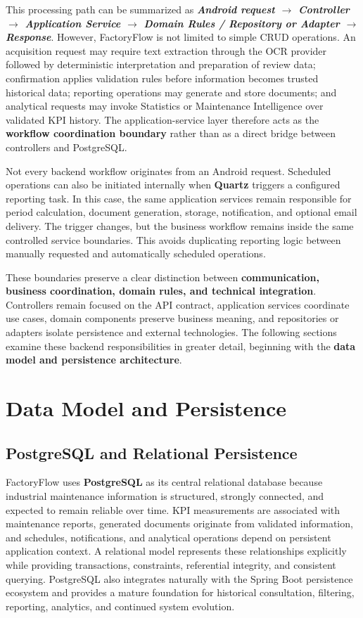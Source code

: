 This processing path can be summarized as \textbf{\textit{Android request $\rightarrow$ Controller $\rightarrow$ Application Service $\rightarrow$ Domain Rules / Repository or Adapter $\rightarrow$ Response}}. However, FactoryFlow is not limited to simple CRUD operations. An acquisition request may require text extraction through the OCR provider followed by deterministic interpretation and preparation of review data; confirmation applies validation rules before information becomes trusted historical data; reporting operations may generate and store documents; and analytical requests may invoke Statistics or Maintenance Intelligence over validated KPI history. The application-service layer therefore acts as the \textbf{workflow coordination boundary} rather than as a direct bridge between controllers and PostgreSQL.

Not every backend workflow originates from an Android request. Scheduled operations can also be initiated internally when \textbf{Quartz} triggers a configured reporting task. In this case, the same application services remain responsible for period calculation, document generation, storage, notification, and optional email delivery. The trigger changes, but the business workflow remains inside the same controlled service boundaries. This avoids duplicating reporting logic between manually requested and automatically scheduled operations.

These boundaries preserve a clear distinction between \textbf{communication, business coordination, domain rules, and technical integration}. Controllers remain focused on the API contract, application services coordinate use cases, domain components preserve business meaning, and repositories or adapters isolate persistence and external technologies. The following sections examine these backend responsibilities in greater detail, beginning with the \textbf{data model and persistence architecture}.
\section{Data Model and Persistence}
\subsection{PostgreSQL and Relational Persistence}
\label{subsec:backend-postgresql-persistence}

FactoryFlow uses \textbf{PostgreSQL} as its central relational database because industrial maintenance information is structured, strongly connected, and expected to remain reliable over time. KPI measurements are associated with maintenance reports, generated documents originate from validated information, and schedules, notifications, and analytical operations depend on persistent application context. A relational model represents these relationships explicitly while providing transactions, constraints, referential integrity, and consistent querying. PostgreSQL also integrates naturally with the Spring Boot persistence ecosystem and provides a mature foundation for historical consultation, filtering, reporting, analytics, and continued system evolution.


